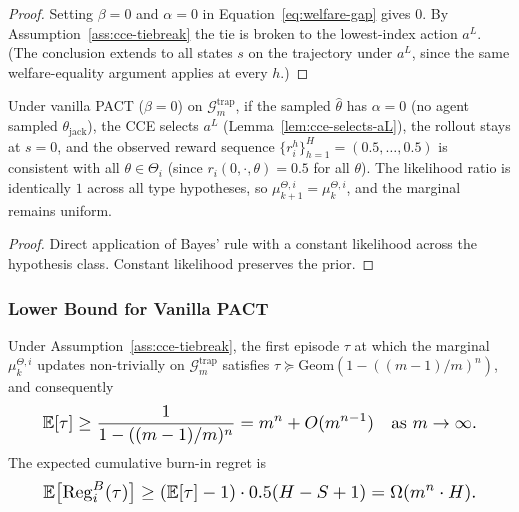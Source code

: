 \begin{proof}
Setting $\beta = 0$ and $\alpha = 0$ in Equation~\eqref{eq:welfare-gap} gives $0$. By Assumption~\ref{ass:cce-tiebreak} the tie is broken to the lowest-index action $a^L$. (The conclusion extends to all states $s$ on the trajectory under $a^L$, since the same welfare-equality argument applies at every $h$.)
\end{proof}

\begin{lemma}[Posterior non-update under $\alpha = 0$ rollout]
\label{lem:posterior-stuck}
Under vanilla PACT ($\beta = 0$) on $\mathcal{G}_m^{\mathrm{trap}}$, if the sampled $\hat\theta$ has $\alpha = 0$ (no agent sampled $\theta_{\mathrm{jack}}$), the CCE selects $a^L$ (Lemma~\ref{lem:cce-selects-aL}), the rollout stays at $s = 0$, and the observed reward sequence $\{r^h_i\}_{h=1}^H = (0.5, \ldots, 0.5)$ is consistent with all $\theta \in \Theta_i$ (since $r_i(0, \cdot, \theta) = 0.5$ for all $\theta$). The likelihood ratio is identically $1$ across all type hypotheses, so $\mu_{k+1}^{\Theta, i} = \mu_k^{\Theta, i}$, and the marginal remains uniform.
\end{lemma}

\begin{proof}
Direct application of Bayes' rule with a constant likelihood across the hypothesis class. Constant likelihood preserves the prior.
\end{proof}

\subsubsection{Lower Bound for Vanilla PACT}
\label{app:pact-plus-lower}

\begin{proposition}
\label{prop:vanilla-burnin}
Under Assumption~\ref{ass:cce-tiebreak}, the first episode $\tau$ at which the marginal $\mu_k^{\Theta, i}$ updates non-trivially on $\mathcal{G}_m^{\mathrm{trap}}$ satisfies $\tau \succeq \mathrm{Geom}(1 - ((m-1)/m)^n)$, and consequently
\begin{equation}\resizebox{0.9\linewidth}{!}{$\displaystyle \mathbb{E}[\tau] \geq \frac{1}{1 - ((m-1)/m)^n} = m^n + O(m^{n-1}) \quad \text{as } m \to \infty. $}\end{equation}
The expected cumulative burn-in regret is
\begin{equation}\resizebox{0.9\linewidth}{!}{$\displaystyle \mathbb{E}\big[\mathrm{Reg}_i^B(\tau)\big] \geq (\mathbb{E}[\tau] - 1) \cdot 0.5(H - S + 1) = \Omega(m^n \cdot H). $}\end{equation}
\end{proposition}

